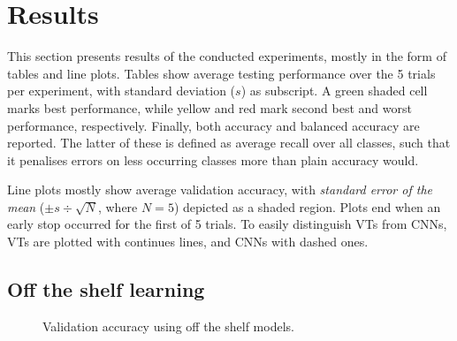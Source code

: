 \section{Results}

This section presents results of the conducted experiments, mostly in the form of tables and line plots. Tables show average testing performance over the 5 trials per experiment, with standard deviation ($s$) as subscript. A green shaded cell marks best performance, while yellow and red mark second best and worst performance, respectively. Finally, both accuracy and balanced accuracy are reported. The latter of these is defined as average recall over all classes, such that it penalises errors on less occurring classes more than plain accuracy would.

Line plots mostly show average validation accuracy, with \textit{standard error of the mean} ($\pm s \div \sqrt{N}$, where $N=5$) depicted as a shaded region. Plots end when an early stop occurred for the first of 5 trials. To easily distinguish VTs from CNNs, VTs are plotted with continues lines, and CNNs with dashed ones.



\subsection{Off the shelf learning} \label{results:ots}

\begin{figure}[tb]
    \centering
    \def\svgwidth{\textwidth}
    
    \caption{Validation accuracy using off the shelf models.}
    \label{results:img:ots}
\end{figure}

